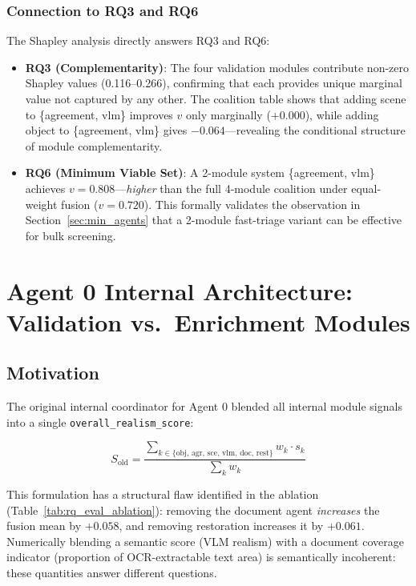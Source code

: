 \documentclass[12pt,onecolumn,a4paper]{IEEEtran}
\begin{document}
\subsubsection{Connection to RQ3 and RQ6}

The Shapley analysis directly answers RQ3 and RQ6:

\begin{itemize}
  \item \textbf{RQ3 (Complementarity)}: The four validation modules contribute non-zero Shapley values (0.116--0.266), confirming that each provides unique marginal value not captured by any other. The coalition table shows that adding scene to \{agreement, vlm\} improves $v$ only marginally ($+0.000$), while adding object to \{agreement, vlm\} gives $-0.064$---revealing the conditional structure of module complementarity.
  \item \textbf{RQ6 (Minimum Viable Set)}: A 2-module system \{agreement, vlm\} achieves $v = 0.808$---\textit{higher} than the full 4-module coalition under equal-weight fusion ($v = 0.720$). This formally validates the observation in Section~\ref{sec:min_agents} that a 2-module fast-triage variant can be effective for bulk screening.
\end{itemize}

\section{Agent 0 Internal Architecture: Validation vs.\ Enrichment Modules}
\label{sec:e3_decoupling}

\subsection{Motivation}

The original internal coordinator for Agent 0 blended all internal module signals into a single \texttt{overall\_realism\_score}:

\begin{equation}
  S_{\text{old}} = \frac{\sum_{k \in \{\text{obj, agr, sce, vlm, doc, rest}\}} w_k \cdot s_k}{\sum_k w_k}
\end{equation}

This formulation has a structural flaw identified in the ablation (Table~\ref{tab:rq_eval_ablation}): removing the document agent \textit{increases} the fusion mean by $+0.058$, and removing restoration increases it by $+0.061$. Numerically blending a semantic score (VLM realism) with a document coverage indicator (proportion of OCR-extractable text area) is semantically incoherent: these quantities answer different questions.
\end{document}
